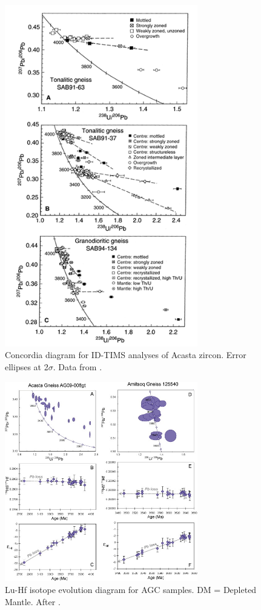 \documentclass{article}
\begin{document}
\begin{figure}[htbp]
    \centering
    \includegraphics[width=0.75\textwidth]{acasta_concordia.png}
    \caption{Concordia diagram for ID-TIMS analyses of Acasta zircon. Error ellipses at 2\(\sigma\). Data from \cite{Bowring1999}.}
    \label{fig:acasta_concordia}
\end{figure}

\begin{figure}[htbp]
    \centering
    \includegraphics[width=0.75\textwidth]{hf_evolution.jpg}
    \caption{Lu-Hf isotope evolution diagram for AGC samples. DM = Depleted Mantle. After \cite{Vervoort2015}.}
    \label{fig:hf_evolution}
\end{figure}
\end{document}
